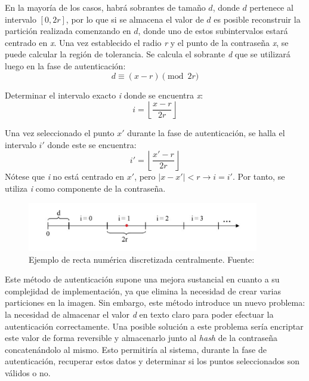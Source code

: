 En la mayoría de los casos, habrá sobrantes de tamaño \(d\), donde \(d\) pertenece al intervalo $[0, 2r]$, por lo que si se almacena el valor de \(d\) es posible reconstruir la partición realizada comenzando en \(d\), donde uno de estos subintervalos estará centrado en \textit{x}. Una vez establecido el radio \textit{r} y el punto de la contraseña \textit{x}, se puede calcular la región de tolerancia. Se calcula el sobrante \textit{d} que se utilizará luego en la fase de autenticación:
\begin{equation}
	d \equiv (x - r) \pmod{2r} \label{eq:sobrante}
\end{equation}

Determinar el intervalo exacto \textit{i} donde se encuentra \textit{x}:
\begin{equation}
	i = \left\lfloor \frac{x - r}{2r} \right\rfloor \label{eq:intervalo_registro}
\end{equation}

Una vez seleccionado el punto $x'$ durante la fase de autenticación, se halla el intervalo $i'$ donde este se encuentra:
\begin{equation}
	i' = \left\lfloor \frac{x' - r}{2r} \right\rfloor \label{eq:intervalo_autenticacion}
\end{equation}
Nótese que \textit{i} no está centrado en $x'$, pero \(|x - x'| < r \rightarrow i = i'\). Por tanto, se utiliza \textit{i} como componente de la contraseña.

	\begin{figure}[H]
		\centering
		\includegraphics[width=0.9\textwidth]{image5.png}	
		\caption{Ejemplo de recta num\'erica discretizada centralmente. Fuente: \cite{bicakci2008optimal}}	
	\end{figure}

Este método de autenticación supone una mejora sustancial en cuanto a su complejidad de implementación, ya que elimina la necesidad de crear varias particiones en la imagen. Sin embargo, este método introduce un nuevo problema: la necesidad de almacenar el valor \textit{d} en texto claro para poder efectuar la autenticación correctamente. Una posible solución a este problema sería encriptar este valor de forma reversible y almacenarlo junto al \textit{hash} de la contraseña concatenándolo al mismo. Esto permitiría al sistema, durante la fase de autenticación, recuperar estos datos y determinar si los puntos seleccionados son válidos o no.


